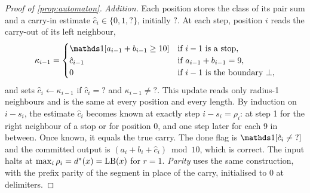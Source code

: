 \begin{proof}[Proof of \cref{prop:automaton}]
\emph{Addition.} Each position stores the class of its pair sum and a carry-in estimate
$\hat c_i\in\{0,1,?\}$, initially $?$. At each step, position $i$ reads the carry-out of its left
neighbour,
\begin{equation*}
  \kappa_{i-1} =
  \begin{cases}
    \ind[a_{i-1}+b_{i-1}\ge 10] & \text{if } i-1 \text{ is a stop},\\
    \hat c_{i-1} & \text{if } a_{i-1}+b_{i-1}=9,\\
    0 & \text{if } i-1 \text{ is the boundary } \pad,
  \end{cases}
\end{equation*}
and sets $\hat c_i\gets\kappa_{i-1}$ if $\hat c_i={?}$ and $\kappa_{i-1}\ne{?}$. This update reads only
radius-1 neighbours and is the same at every position and every length. By induction on $i-s_i$, the
estimate $\hat c_i$ becomes known at exactly step $i-s_i=\rho_i$: at step 1 for the right neighbour of a
stop or for position 0, and one step later for each 9 in between. Once known, it equals the true carry.
The done flag is $\ind[\hat c_i\ne{?}]$ and the committed output is $(a_i+b_i+\hat c_i)\bmod 10$, which is
correct. The input halts at $\max_i\rho_i=d^{*}(x)=\operatorname{LB}(x)$ for $r=1$. \emph{Parity} uses the same
construction, with the prefix parity of the segment in place of the carry, initialised to $0$ at
delimiters.
\end{proof}
